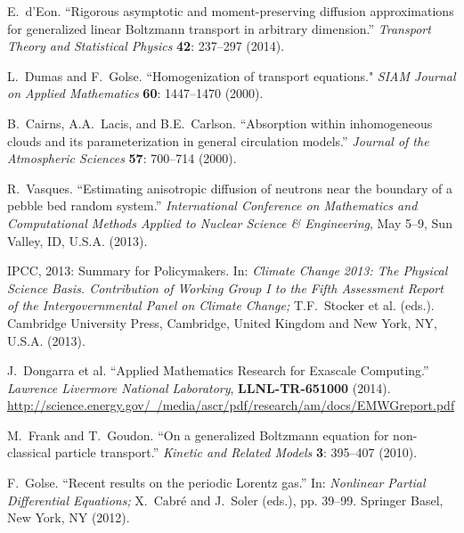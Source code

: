 \documentclass[12pt]{article}
\begin{document}
\begin{thebibliography}{10}
E.~d'Eon.
``Rigorous asymptotic and moment-preserving diffusion approximations for generalized linear Boltzmann transport in arbitrary dimension.''
\textit{Transport Theory and Statistical Physics} \textbf{42}: 237--297 (2014).\vspace{-5pt}

L.~Dumas and F.~Golse.
``Homogenization of transport equations."
\textit{SIAM Journal on Applied Mathematics} \textbf{60}: 1447--1470 (2000). \vspace{-5pt}

B.~Cairns, A.A.~Lacis, and B.E.~Carlson.
``Absorption within inhomogeneous clouds and its parameterization in general circulation models.''
\textit{Journal of the Atmospheric Sciences} \textbf{57}: 700--714 (2000).\vspace{-5pt}

R.~Vasques.
``Estimating anisotropic diffusion of neutrons near the boundary of a pebble bed random system.''
\textit{International Conference on Mathematics and Computational Methods Applied to Nuclear Science \& Engineering}, May 5--9, Sun Valley, ID, U.S.A. (2013).\vspace{-5pt}

IPCC, 2013: Summary for Policymakers.
In: \textit{Climate Change 2013: The Physical Science Basis. Contribution of
Working Group I to the Fifth Assessment Report of the Intergovernmental Panel on Climate Change;} T.F.~Stocker et al. (eds.).
Cambridge University Press, Cambridge, United Kingdom and New York, NY, U.S.A. (2013).
\vspace{-5pt}

J.~Dongarra et al.
``Applied Mathematics Research for Exascale Computing.''
\textit{Lawrence Livermore
National Laboratory}, \textbf{LLNL-TR-651000} (2014).\\
\href{http://science.energy.gov/~/media/ascr/pdf/research/am/docs/EMWGreport.pdf}{http://science.energy.gov/~/media/ascr/pdf/research/am/docs/EMWGreport.pdf}
\vspace{-5pt}

M.~Frank and T.~Goudon.
``On a generalized Boltzmann equation for non-classical particle transport.''
\textit{Kinetic and Related Models} \textbf{3}: 395--407 (2010).
\vspace{-5pt}

F.~Golse.
``Recent results on the periodic Lorentz gas.''
In: \textit{Nonlinear Partial Differential Equations;} X.~Cabr\'e and J.~Soler (eds.), pp. 39--99.
Springer Basel, New York, NY (2012).
\vspace{-5pt}


\end{thebibliography}
\end{document}
